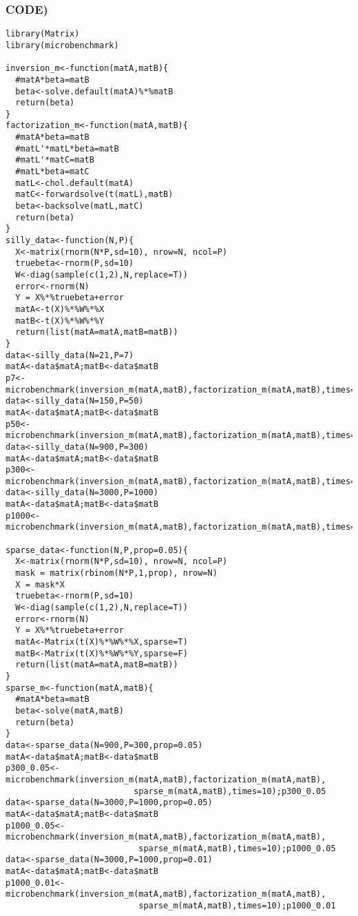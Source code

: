 \documentclass{article}
\begin{document}
\subsubsection*{CODE)}

\begin{lstlisting}
library(Matrix)
library(microbenchmark)

inversion_m<-function(matA,matB){
  #matA*beta=matB
  beta<-solve.default(matA)%*%matB
  return(beta)
}
factorization_m<-function(matA,matB){
  #matA*beta=matB
  #matL'*matL*beta=matB
  #matL'*matC=matB
  #matL*beta=matC
  matL<-chol.default(matA)
  matC<-forwardsolve(t(matL),matB)
  beta<-backsolve(matL,matC)
  return(beta)
}
silly_data<-function(N,P){
  X<-matrix(rnorm(N*P,sd=10), nrow=N, ncol=P)
  truebeta<-rnorm(P,sd=10)
  W<-diag(sample(c(1,2),N,replace=T))
  error<-rnorm(N)
  Y = X%*%truebeta+error
  matA<-t(X)%*%W%*%X
  matB<-t(X)%*%W%*%Y
  return(list(matA=matA,matB=matB))
}
data<-silly_data(N=21,P=7)
matA<-data$matA;matB<-data$matB
p7<-microbenchmark(inversion_m(matA,matB),factorization_m(matA,matB),times=10);p7
data<-silly_data(N=150,P=50)
matA<-data$matA;matB<-data$matB
p50<-microbenchmark(inversion_m(matA,matB),factorization_m(matA,matB),times=10);p50
data<-silly_data(N=900,P=300)
matA<-data$matA;matB<-data$matB
p300<-microbenchmark(inversion_m(matA,matB),factorization_m(matA,matB),times=10);p300
data<-silly_data(N=3000,P=1000)
matA<-data$matA;matB<-data$matB
p1000<-microbenchmark(inversion_m(matA,matB),factorization_m(matA,matB),times=10);p1000

sparse_data<-function(N,P,prop=0.05){
  X<-matrix(rnorm(N*P,sd=10), nrow=N, ncol=P)
  mask = matrix(rbinom(N*P,1,prop), nrow=N)
  X = mask*X
  truebeta<-rnorm(P,sd=10)
  W<-diag(sample(c(1,2),N,replace=T))
  error<-rnorm(N)
  Y = X%*%truebeta+error
  matA<-Matrix(t(X)%*%W%*%X,sparse=T)
  matB<-Matrix(t(X)%*%W%*%Y,sparse=F)
  return(list(matA=matA,matB=matB))
}
sparse_m<-function(matA,matB){
  #matA*beta=matB
  beta<-solve(matA,matB)
  return(beta)
}
data<-sparse_data(N=900,P=300,prop=0.05)
matA<-data$matA;matB<-data$matB
p300_0.05<-microbenchmark(inversion_m(matA,matB),factorization_m(matA,matB),
                          sparse_m(matA,matB),times=10);p300_0.05
data<-sparse_data(N=3000,P=1000,prop=0.05)
matA<-data$matA;matB<-data$matB
p1000_0.05<-microbenchmark(inversion_m(matA,matB),factorization_m(matA,matB),
                           sparse_m(matA,matB),times=10);p1000_0.05
data<-sparse_data(N=3000,P=1000,prop=0.01)
matA<-data$matA;matB<-data$matB
p1000_0.01<-microbenchmark(inversion_m(matA,matB),factorization_m(matA,matB),
                           sparse_m(matA,matB),times=10);p1000_0.01
\end{lstlisting}
\end{document}

